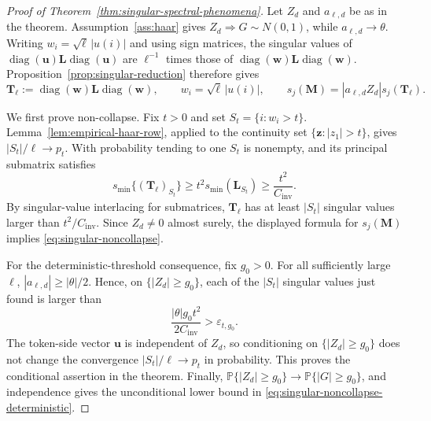 \documentclass{article}
\newcommand{\Prob}{\mathbb{P}}
\newcommand{\diag}{\operatorname{diag}}
\newcommand{\weak}{\Rightarrow}
\newcommand{\bM}{\mathbf{M}}
\newcommand{\bL}{\mathbf{L}}
\newcommand{\bT}{\mathbf{T}}
\newcommand{\bu}{\mathbf{u}}
\newcommand{\bw}{\mathbf{w}}
\theoremstyle{definition}
\theoremstyle{remark}
\begin{document}
\begin{proof}[Proof of Theorem~\ref{thm:singular-spectral-phenomena}]
Let $Z_d$ and $a_{\ell,d}$ be as in the theorem.  Assumption~\ref{ass:haar}
gives $Z_d\weak G\sim N(0,1)$, while $a_{\ell,d}\to\theta$.
Writing $w_i=\sqrt\ell\,|u(i)|$ and using sign matrices, the singular values of
$\diag(\bu)\bL\diag(\bu)$ are $\ell^{-1}$ times those of
$\diag(\bw)\bL\diag(\bw)$.  Proposition~\ref{prop:singular-reduction}
therefore gives
\[
    \bT_\ell:=\diag(\bw)\bL\diag(\bw),
    \qquad
    w_i=\sqrt\ell\,|u(i)|,
    \qquad
    s_j(\bM)=|a_{\ell,d}Z_d|s_j(\bT_\ell).
\]

We first prove non-collapse.  Fix $t>0$ and set
$S_t=\{i:w_i>t\}$.  Lemma~\ref{lem:empirical-haar-row}, applied to the
continuity set $\{\mathbf z:|z_1|>t\}$, gives
$|S_t|/\ell\to p_t$.  With probability tending to one $S_t$ is nonempty, and
its principal submatrix satisfies
\[
    s_{\min}\{(\bT_\ell)_{S_t}\}
    \geq
    t^2s_{\min}(\bL_{S_t})
    \geq
    \frac{t^2}{C_{\mathrm{inv}}}.
\]
By singular-value interlacing for submatrices, $\bT_\ell$ has at least
$|S_t|$ singular values larger than $t^2/C_{\mathrm{inv}}$.  Since
$Z_d\neq0$ almost surely, the displayed formula for $s_j(\bM)$ implies
\eqref{eq:singular-noncollapse}.

For the deterministic-threshold consequence, fix $g_0>0$.  For all
sufficiently large $\ell$, $|a_{\ell,d}|\geq|\theta|/2$.  Hence, on
$\{|Z_d|\geq g_0\}$, each of the $|S_t|$ singular values just found is larger
than
\[
    \frac{|\theta|g_0t^2}{2C_{\mathrm{inv}}}
    >
    \varepsilon_{t,g_0}.
\]
The token-side vector $\bu$ is independent of $Z_d$, so conditioning on
$\{|Z_d|\geq g_0\}$ does not change the convergence $|S_t|/\ell\to p_t$ in
probability.  This proves the conditional assertion in the theorem.  Finally,
$\Prob\{|Z_d|\geq g_0\}\to\Prob\{|G|\geq g_0\}$, and independence gives the
unconditional lower bound in
\eqref{eq:singular-noncollapse-deterministic}.


\end{proof}
\end{document}
